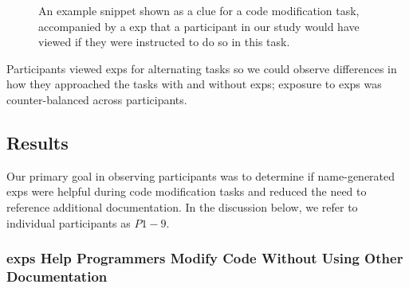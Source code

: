 \begin{figure}
\centering
{}
\caption{An example snippet shown as a clue for a code modification task, accompanied by a \gls{exp} that a participant in our study would have viewed if they were instructed to do so in this task.}
\label{fig:study_snippet}
\end{figure}

Participants viewed \glspl{exp} for alternating tasks so we could observe differences in how they approached the tasks with and without \glspl{exp}; exposure to \glspl{exp} was counter-balanced across participants. 


\subsection{Results}

Our primary goal in observing participants was to determine if \gls{name}-generated \glspl{exp} were helpful  during code modification tasks and reduced the need to reference additional documentation.
In the discussion below, we refer to individual participants as $P{1-9}$.

\subsubsection{ \Glspl{exp} Help Programmers Modify Code Without Using Other Documentation}

